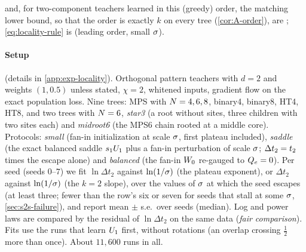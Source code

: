 and, for two-component teachers learned in this (greedy) order, the matching lower bound, so that the order is
exactly $k$ on every tree (\cref{cor:A-order}), are \proven; \eqref{eq:locality-rule} is \derived{} (leading
order, small $\sigma$). \knownresult[mechanism and trichotomy: \citealp{kumar2026learning}, Thm~8;
\citealp{rawal2026theory}, Thm~4.2; descent along a whole connected set of rank-deficient bonds:
\citealp{furman2026benign}, Lemma~D.8; head start for $k=2$: \citealp{zhang2026saddletosaddle}, Thm~4,
\citealp{kunin2025alternating}, Sec.~2.2] 

\paragraph{Setup} (details in \cref{app:exp-locality}).
Orthogonal pattern teachers with $d=2$ and weights $(1,0.5)$ unless stated, $\chi=2$, whitened inputs, gradient
flow on the exact population loss. Nine trees: MPS with $N=4,6,8$, binary4, binary8, HT4, HT8, and two trees
with $N=6$, \emph{star3} (a root without sites, three children with two sites each) and \emph{midroot6} (the
MPS6 chain rooted at a middle core). Protocols: \emph{small} (fan-in initialization at scale $\sigma$, first
plateau included), \emph{saddle} (the exact balanced saddle $s_{1}U_{1}$ plus a fan-in perturbation of scale
$\sigma$; $\Delta t_2=t_{2}$ times the escape alone) and \emph{balanced} (the fan-in $W_{0}$ re-gauged to $Q_{e}=0$).
Per seed (seeds $0$--$7$) we fit $\ln\Delta t_2$ against $\ln(1/\sigma)$ (the plateau exponent), or $\Delta t_2$ against
$\ln(1/\sigma)$ (the $k=2$ slope), over the values of $\sigma$ at which the seed escapes (at least three; fewer than
the row's six or seven for seeds that stall at some $\sigma$, \cref{sec:s2s-failure}), and report mean $\pm$ s.e.\
over seeds (median). Log and power laws are compared by the residual of $\ln\Delta t_2$ on the same data
(\emph{fair comparison}). Fits use the runs that learn $U_{1}$ first, without rotations (an overlap crossing
$\frac12$ more than once). About $11{,}600$ runs in all.

